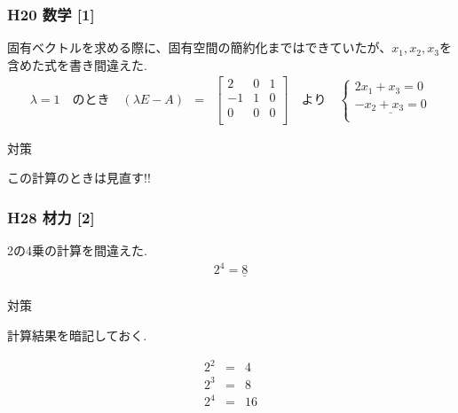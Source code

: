 \documentclass[a4paper]{jsarticle}
\begin{document}
\subsubsection{H20 数学 [1]}
固有ベクトルを求める際に、固有空間の簡約化まではできていたが、$x_1,x_2,x_3$を含めた式を書き間違えた.\\
\begin{eqnarray*}
    \lambda=1\quad のとき\quad
    \left(\lambda E - A\right)
    &=&
    \begin{bmatrix}
        2  & 0 & 1 \\
        -1 & 1 & 0 \\
        0  & 0 & 0 \\
    \end{bmatrix}
    \quad より\quad
    \begin{cases}
        {2x_1+x_3=0}             \\
        {\underline{-x_2+x_3=0}} \\
    \end{cases}
\end{eqnarray*}
\begin{itembox}[l]{対策}
    \begin{center}
        この計算のときは見直す!!
    \end{center}
\end{itembox}
\subsubsection{H28 材力 [2]}
2の4乗の計算を間違えた.
\begin{eqnarray*}
    2^4=\underline{8}\\
\end{eqnarray*}
\begin{itembox}[l]{対策}
    \begin{center}
        計算結果を暗記しておく.
    \end{center}
    \begin{eqnarray*}
        2^2&=&4\\
        2^3&=&8\\
        2^4&=&16\\
    \end{eqnarray*}
\end{itembox}
\end{document}
